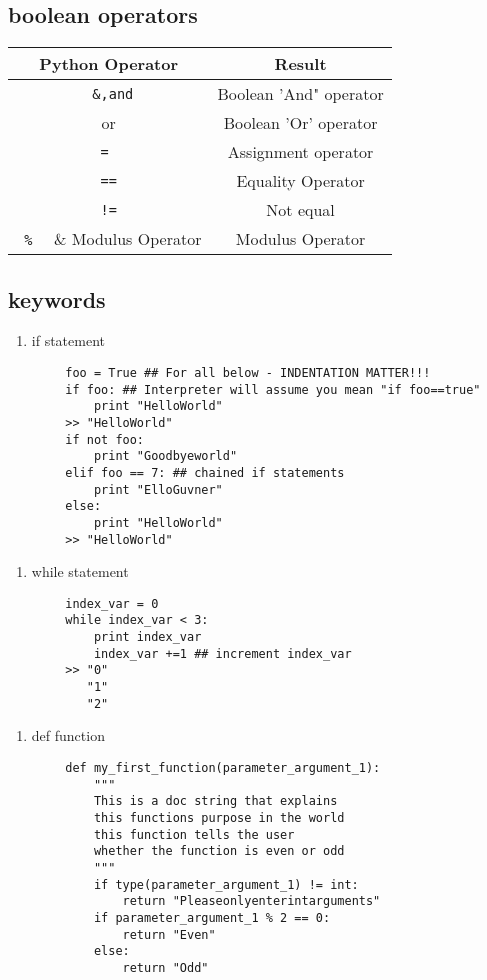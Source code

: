 \documentclass{article}
\begin{document}
		\subsection{boolean operators}
			\begin{table}[h]
				\centering
				\begin{tabular}{c|c}
					\textbf{Python Operator} & \textbf{Result} \\ \hline
					\verb| &,and| & Boolean 'And" operator \\
					      or  & Boolean 'Or' operator \\ 
					\verb|= | & Assignment operator  \\
					\verb|==| & Equality Operator \\ 
					\verb| != | & Not equal \\
					\verb| %  | & Modulus Operator \\
				\end{tabular}
			\end{table}
		\subsection{keywords}
		\begin{enumerate}
			\item if statement
		\end{enumerate}
		\begin{lstlisting}
		foo = True ## For all below - INDENTATION MATTER!!!
		if foo: ## Interpreter will assume you mean "if foo==true"
			print "HelloWorld"
		>> "HelloWorld"
		if not foo:
			print "Goodbyeworld"
		elif foo == 7: ## chained if statements
			print "ElloGuvner"
		else:
			print "HelloWorld"
		>> "HelloWorld"
		\end{lstlisting}
		\begin{enumerate}
			\item while statement
		\end{enumerate}
		\begin{lstlisting}
		index_var = 0
		while index_var < 3:
			print index_var
			index_var +=1 ## increment index_var
		>> "0"
		   "1"
		   "2"
		\end{lstlisting}
		\begin{enumerate}
			\item def function
		\end{enumerate}
		\begin{lstlisting}
		def my_first_function(parameter_argument_1):
			"""
			This is a doc string that explains 
			this functions purpose in the world
			this function tells the user
			whether the function is even or odd
			"""
			if type(parameter_argument_1) != int:
				return "Pleaseonlyenterintarguments"
			if parameter_argument_1 % 2 == 0:
				return "Even"
			else:
				return "Odd"
		\end{lstlisting}
		
\end{document}
